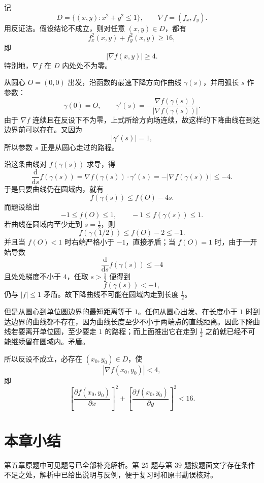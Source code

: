 \begin{solutionblock}

记
\[
D=\{(x,y):x^2+y^2\le1\},\qquad \nabla f=(f_x,f_y).
\]
用反证法。假设结论不成立，则对任意 \((x,y)\in D\)，都有
\[
f_x^2(x,y)+f_y^2(x,y)\ge16,
\]
即
\[
|\nabla f(x,y)|\ge4.
\]
特别地，\(\nabla f\) 在 \(D\) 内处处不为零。

从圆心 \(O=(0,0)\) 出发，沿函数的最速下降方向作曲线 \(\gamma(s)\)，并用弧长 \(s\) 作参数：
\[
\gamma(0)=O,\qquad
\gamma'(s)=-\frac{\nabla f(\gamma(s))}{|\nabla f(\gamma(s))|}.
\]
由于 \(\nabla f\) 连续且在反设下不为零，上式所给方向场连续，故这样的下降曲线在到达边界前可以存在。又因为
\[
|\gamma'(s)|=1,
\]
所以参数 \(s\) 正是从圆心走过的路程。

沿这条曲线对 \(f(\gamma(s))\) 求导，得
\[
\frac{\mathrm d}{\mathrm ds}f(\gamma(s))
=\nabla f(\gamma(s))\cdot \gamma'(s)
=-|\nabla f(\gamma(s))|
\le -4.
\]
于是只要曲线仍在圆域内，就有
\[
f(\gamma(s))\le f(O)-4s.
\]
而题设给出
\[
-1\le f(O)\le1,\qquad -1\le f(\gamma(s))\le1.
\]
若曲线在圆域内至少走到 \(s=\frac12\)，则
\[
f(\gamma(1/2))\le f(O)-2\le -1.
\]
并且当 \(f(O)<1\) 时右端严格小于 \(-1\)，直接矛盾；当 \(f(O)=1\) 时，由于一开始导数
\[
\frac{\mathrm d}{\mathrm ds}f(\gamma(s))\le-4
\]
且处处梯度不小于 \(4\)，任取 \(s>\frac12\) 便得到
\[
f(\gamma(s))< -1,
\]
仍与 \(|f|\le1\) 矛盾。故下降曲线不可能在圆域内走到长度 \(\frac12\)。

但是从圆心到单位圆边界的最短距离等于 \(1\)。任何从圆心出发、在长度小于 \(1\) 时到达边界的曲线都不存在，因为曲线长度至少不小于两端点的直线距离。因此下降曲线若要离开单位圆，至少要走 \(1\) 的路程；而上面推出它在走到 \(\frac12\) 之前就已经不可能继续留在圆域内。矛盾。

所以反设不成立，必存在 \((x_0,y_0)\in D\)，使
\[
|\nabla f(x_0,y_0)|<4,
\]
即
\[
\boxed{
\left[\frac{\partial f(x_0,y_0)}{\partial x}\right]^2+
\left[\frac{\partial f(x_0,y_0)}{\partial y}\right]^2<16
}.
\]

\end{solutionblock}

\section{本章小结}
第五章原题中可见题号已全部补充解析。第 \(25\) 题与第 \(39\) 题按题面文字存在条件不足之处，解析中已给出说明与反例，便于复习时和原书勘误核对。
